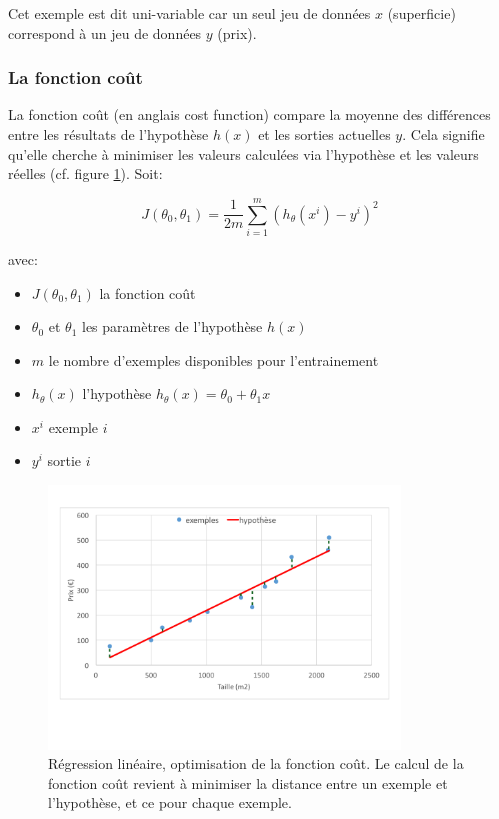 Cet exemple est dit uni-variable car un seul jeu de données $x$ (superficie) correspond à un jeu de données $y$ (prix).


\subsubsection{La fonction coût}
La fonction coût (en anglais cost function) compare la moyenne des différences entre les résultats de l'hypothèse $h(x)$ et les sorties actuelles $y$. Cela signifie qu'elle cherche à minimiser les valeurs calculées via l'hypothèse et les valeurs réelles (cf. figure \ref{fig:Régression linéaire, optimisation de la fonction coût}). 
Soit: 

\begin{equation}
	J(\theta_0,\theta_1) = \frac{1}{2m}\sum_{i=1}^{m}(h_\theta(x^i)-y^i)^2
\end{equation}

avec:
\begin{itemize}
	\item $J(\theta_0,\theta_1)$ la fonction coût
	\item $\theta_0$ et $\theta_1$ les paramètres de l'hypothèse $h(x)$
	\item $m$ le nombre d'exemples disponibles pour l'entrainement 
	\item $h_\theta(x)$ l'hypothèse $h_\theta (x) = \theta_0 + \theta_1 x$
	\item $x^i$ exemple $i$
	\item $y^i$ sortie $i$
\end{itemize}

\begin{figure}[h]
	\centering\includegraphics[height=7cm]{images/cost.png}
	\caption[Régression linéaire, optimisation de la fonction coût]{Régression linéaire, optimisation de la fonction coût. Le calcul de la fonction coût revient à minimiser la distance entre un exemple et l'hypothèse, et ce pour chaque exemple.}
	\label{fig:Régression linéaire, optimisation de la fonction coût}
\end{figure}


